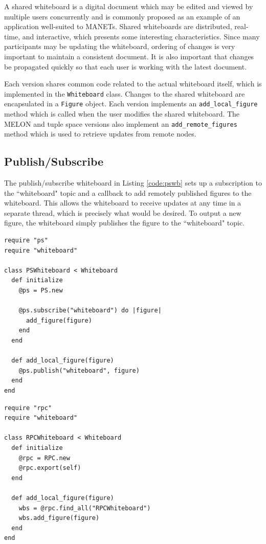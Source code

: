 A shared whiteboard is a digital document which may be edited and viewed by multiple users concurrently and is commonly proposed as an example of an application well-suited to MANETs\cite{wb5}\cite{wb6}. Shared whiteboards are distributed, real-time, and interactive, which presents some interesting characteristics. Since many participants may be updating the whiteboard, ordering of changes is very important to maintain a consistent document. It is also important that changes be propagated quickly so that each user is working with the latest document.

Each version shares common code related to the actual whiteboard itself, which is implemented in the \texttt{Whiteboard} class. Changes to the shared whiteboard are encapsulated in a \texttt{Figure} object. Each version implements an \texttt{add\_local\_figure} method which is called when the user modifies the shared whiteboard. The MELON and tuple space versions also implement an \texttt{add\_remote\_figures} method which is used to retrieve updates from remote nodes.

\subsection{Publish/Subscribe}

The publish/subscribe whiteboard in Listing \ref{code:pswb} sets up a subscription to the ``whiteboard" topic and a callback to add remotely published figures to the whiteboard. This allows the whiteboard to receive updates at any time in a separate thread, which is precisely what would be desired. To output a new figure, the whiteboard simply publishes the figure to the ``whiteboard" topic.


\begin{lstlisting}[caption={Publish/Subscribe Whiteboard}, label={code:pswb}]
require "ps"
require "whiteboard"

class PSWhiteboard < Whiteboard
  def initialize
    @ps = PS.new
    
    @ps.subscribe("whiteboard") do |figure|
      add_figure(figure)
    end
  end

  def add_local_figure(figure)
    @ps.publish("whiteboard", figure)
  end
end
\end{lstlisting}

\begin{lstlisting}[caption={RPC Whiteboard}, label={code:rpcwb}]
require "rpc"
require "whiteboard"

class RPCWhiteboard < Whiteboard
  def initialize
    @rpc = RPC.new
    @rpc.export(self)
  end

  def add_local_figure(figure)
    wbs = @rpc.find_all("RPCWhiteboard")
    wbs.add_figure(figure)
  end
end
\end{lstlisting}


